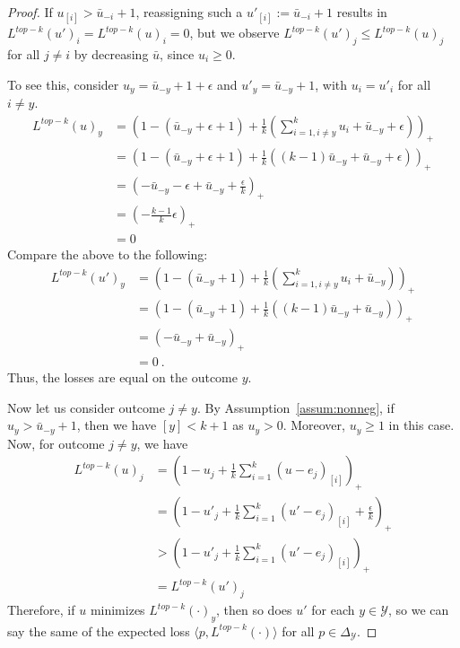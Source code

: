 \documentclass[12pt]{article}
\newcommand{\ubar}{\bar{u}}
\newcommand{\simplex}{\Delta_\Y}
\newcommand{\Y}{\mathcal{Y}}
\newcommand{\inprod}[2]{\langle #1, #2 \rangle}%
\begin{document}
\begin{proof}
	If $u_{[i]} > \bar u_{-i} + 1$, reassigning such a $u'_{[i]} := \bar u_{-i} +1$ results in $L^{top-k}(u')_i = L^{top-k}(u)_i = 0$, but we observe $L^{top-k}(u')_j \leq L^{top-k}(u)_j$ for all $j \neq i$ by decreasing $\ubar$, since $u_i \geq 0$.

To see this, consider $u_y = \bar u_{-y} + 1 + \epsilon$ and $u'_y = \bar u_{-y} + 1$, with $u_i = u'_i$ for all $i \neq y$. 
\begin{align*}
L^{top-k}(u)_y &= \left(1 - (\bar u_{-y} + \epsilon + 1) + \frac 1 k \left(\sum_{i=1, i \neq y}^k u_i + \bar u_{-y} + \epsilon\right) \right)_+\\ 
&= \left(1 - (\bar u_{-y} + \epsilon + 1) + \frac 1 k \left((k-1) \bar u_{-y} + \bar u_{-y} + \epsilon\right) \right)_+\\
&= \left(-\bar u_{-y} - \epsilon + \bar u_{-y} + \frac \epsilon k \right)_+ \\
&= (-\frac{k-1}{k}\epsilon)_+\\
&= 0
\end{align*}
Compare the above to the following:
\begin{align*}
L^{top-k}(u')_y &= \left(1 - (\bar u_{-y} + 1) + \frac 1 k \left(\sum_{i=1, i \neq y}^k u_i + \bar u_{-y} \right) \right)_+\\ 
&= \left(1 - (\bar u_{-y} + 1) + \frac 1 k \left((k-1) \bar u_{-y} + \bar u_{-y} \right) \right)_+\\
&= \left(-\bar u_{-y} + \bar u_{-y}\right)_+ \\
&= 0~.~
\end{align*}
Thus, the losses are equal on the outcome $y$.

Now let us consider outcome $j \neq y$.
By Assumption~\ref{assum:nonneg}, if $u_y > \bar u_{-y} + 1$, then we have $[y] < k+1$ as $u_y > 0$.
Moreover, $u_y \geq 1$ in this case.
Now, for outcome $j \neq y$, we have 
\begin{align*}
L^{top-k}(u)_j &= \left( 1 - u_j + \frac 1 k \sum_{i=1}^k (u-e_j)_{[i]} \right)_+\\
	&= \left( 1 - u'_j + \frac 1 k \sum_{i=1}^k (u'-e_j)_{[i]} + \frac {\epsilon}{k}\right)_+\\
	&> \left( 1 - u'_j + \frac 1 k \sum_{i=1}^k (u'-e_j)_{[i]}\right)_+\\
	&= L^{top-k}(u')_j
\end{align*}
Therefore, if $u$ minimizes $L^{top-k}(\cdot)_y$, then so does $u'$ for each $y \in \Y$, so we can say the same of the expected loss $\inprod{p}{L^{top-k}(\cdot)}$ for all $p \in \simplex$.
\end{proof}
\end{document}
